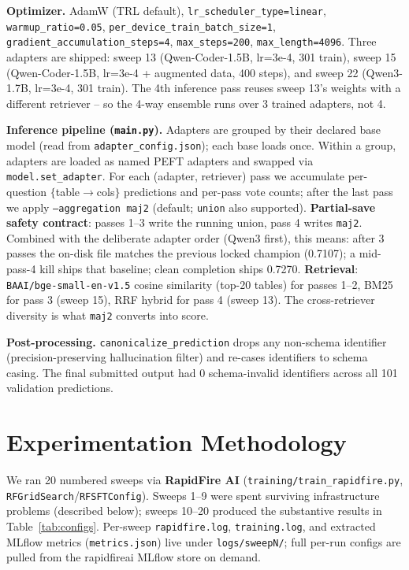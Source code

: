 \documentclass[10pt]{article}
\begin{document}
\textbf{Optimizer.} AdamW (TRL default), \texttt{lr\_scheduler\_type=linear},
\texttt{warmup\_ratio=0.05}, \texttt{per\_device\_train\_batch\_size=1},
\texttt{gradient\_accumulation\_steps=4}, \texttt{max\_steps=200},
\texttt{max\_length=4096}. Three adapters are shipped: sweep 13 (Qwen-Coder-1.5B,
lr=3e-4, 301 train), sweep 15 (Qwen-Coder-1.5B, lr=3e-4 + augmented data,
400 steps), and sweep 22 (Qwen3-1.7B, lr=3e-4, 301 train). The 4th inference
pass reuses sweep 13's weights with a different retriever -- so the 4-way
ensemble runs over 3 trained adapters, not 4.

\textbf{Inference pipeline (\texttt{main.py}).} Adapters are grouped by their
declared base model (read from \texttt{adapter\_config.json}); each base loads
once. Within a group, adapters are loaded as named PEFT adapters and swapped
via \texttt{model.set\_adapter}. For each (adapter, retriever) pass we
accumulate per-question $\{$table$\rightarrow$cols$\}$ predictions and per-pass
vote counts; after the last pass we apply \texttt{--aggregation maj2}
(default; \texttt{union} also supported). \textbf{Partial-save safety
contract}: passes 1--3 write the running union, pass 4 writes \texttt{maj2}.
Combined with the deliberate adapter order (Qwen3 first), this means: after
3 passes the on-disk file matches the previous locked champion (0.7107); a
mid-pass-4 kill ships that baseline; clean completion ships 0.7270.
\textbf{Retrieval}: \texttt{BAAI/bge-small-en-v1.5} cosine similarity (top-20
tables) for passes 1--2, BM25 for pass 3 (sweep 15), RRF hybrid for pass 4
(sweep 13). The cross-retriever diversity is what \texttt{maj2} converts
into score.

\textbf{Post-processing.} \texttt{canonicalize\_prediction} drops any
non-schema identifier (precision-preserving hallucination filter) and re-cases
identifiers to schema casing. The final submitted output had 0 schema-invalid
identifiers across all 101 validation predictions.

\section{Experimentation Methodology}

We ran 20 numbered sweeps via \textbf{RapidFire AI}
(\texttt{training/train\_rapidfire.py}, \texttt{RFGridSearch}/\texttt{RFSFTConfig}). Sweeps
1--9 were spent surviving infrastructure problems (described below); sweeps
10--20 produced the substantive results in Table~\ref{tab:configs}. Per-sweep
\texttt{rapidfire.log}, \texttt{training.log}, and extracted MLflow metrics
(\texttt{metrics.json}) live under \texttt{logs/sweepN/}; full per-run configs
are pulled from the rapidfireai MLflow store on demand.
\end{document}
